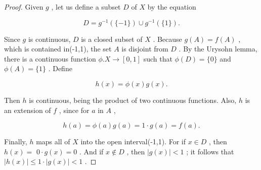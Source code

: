 \begin{proof}
Given \(g\) , let us define a subset \(D\) of \(X\) by the equation

\[
D = {g}^{-1}\left( {\{  - 1\} }\right)  \cup  {g}^{-1}\left( {\{ 1\} }\right) .
\]

Since \(g\) is continuous, \(D\) is a closed subset of \(X\) . Because \(g\left( A\right)  = f\left( A\right)\) , which is contained in(-1,1), the set \(A\) is disjoint from \(D\) . By the Urysohn lemma, there is a continuous function \(\phi .X \rightarrow  \left\lbrack  {0,1}\right\rbrack\) such that \(\phi \left( D\right)  = \{ 0\}\) and \(\phi \left( A\right)  = \{ 1\}\) . Define

\[
h\left( x\right)  = \phi \left( x\right) g\left( x\right) .
\]

Then \(h\) is continuous, being the product of two continuous functions. Also, \(h\) is an extension of \(f\) , since for \(a\) in \(A\) ,

\[
h\left( a\right)  = \phi \left( a\right) g\left( a\right)  = 1 \cdot  g\left( a\right)  = f\left( a\right) .
\]

Finally, \(h\) maps all of \(X\) into the open interval(-1,1). For if \(x \in  D\) , then \(h\left( x\right)  =\)  \(0 \cdot  g\left( x\right)  = 0\) . And if \(x \notin  D\) , then \(\left| {g\left( x\right) }\right|  < 1\) ; it follows that \(\left| {h\left( x\right) }\right|  \leq  1 \cdot  \left| {g\left( x\right) }\right|  < 1\) .
\end{proof}

